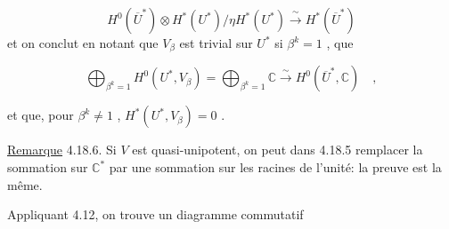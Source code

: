 \begin{equation*}
H^0(\overline{U}^*) \otimes H^*(U^*)/\eta H^*(U^*) \xrightarrow{\;\sim\;} H^*(\overline{U}^*)
\end{equation*}
et on conclut en notant que $V_\beta$ est trivial sur $U^*$ si $\beta^k = 1$ , que

\begin{equation*}
\bigoplus_{\beta^k=1} H^0(U^*, V_\beta) = \bigoplus_{\beta^k=1} \mathbb{C} \xrightarrow{\;\sim\;} H^0(\overline{U}^*, \mathbb{C}) \quad ,
\end{equation*}

et que, pour $\beta^k \neq 1$ , $H^*(U^*, V_\beta) = 0$ .

\underline{Remarque} 4.18.6. Si $V$ est quasi-unipotent, on peut dans 4.18.5 remplacer la sommation sur $\mathbb{C}^*$ par une sommation sur les racines de l'unité: la preuve est la même.

Appliquant 4.12, on trouve un diagramme commutatif

